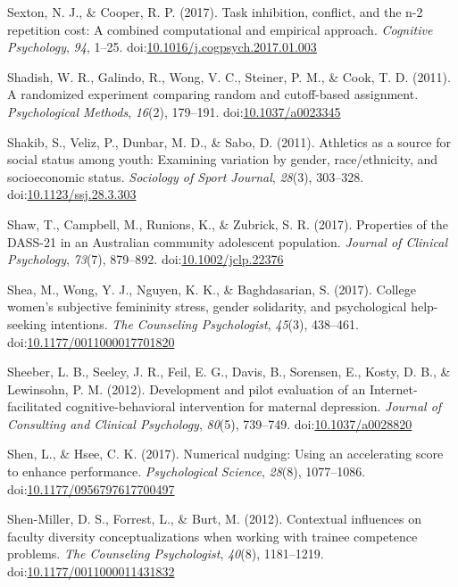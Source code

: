 \documentclass[english,man]{apa6}
\begin{document}
\hypertarget{ref-Sexton2017}{}
Sexton, N. J., \& Cooper, R. P. (2017). Task inhibition, conflict, and
the n-2 repetition cost: A combined computational and empirical
approach. \emph{Cognitive Psychology}, \emph{94}, 1--25.
doi:\href{https://doi.org/10.1016/j.cogpsych.2017.01.003}{10.1016/j.cogpsych.2017.01.003}

\hypertarget{ref-Shadish2011}{}
Shadish, W. R., Galindo, R., Wong, V. C., Steiner, P. M., \& Cook, T. D.
(2011). A randomized experiment comparing random and cutoff-based
assignment. \emph{Psychological Methods}, \emph{16}(2), 179--191.
doi:\href{https://doi.org/10.1037/a0023345}{10.1037/a0023345}

\hypertarget{ref-Shakib2011}{}
Shakib, S., Veliz, P., Dunbar, M. D., \& Sabo, D. (2011). Athletics as a
source for social status among youth: Examining variation by gender,
race/ethnicity, and socioeconomic status. \emph{Sociology of Sport
Journal}, \emph{28}(3), 303--328.
doi:\href{https://doi.org/10.1123/ssj.28.3.303}{10.1123/ssj.28.3.303}

\hypertarget{ref-Shaw2017}{}
Shaw, T., Campbell, M., Runions, K., \& Zubrick, S. R. (2017).
Properties of the DASS-21 in an Australian community adolescent
population. \emph{Journal of Clinical Psychology}, \emph{73}(7),
879--892.
doi:\href{https://doi.org/10.1002/jclp.22376}{10.1002/jclp.22376}

\hypertarget{ref-Shea2017}{}
Shea, M., Wong, Y. J., Nguyen, K. K., \& Baghdasarian, S. (2017).
College women's subjective femininity stress, gender solidarity, and
psychological help-seeking intentions. \emph{The Counseling
Psychologist}, \emph{45}(3), 438--461.
doi:\href{https://doi.org/10.1177/0011000017701820}{10.1177/0011000017701820}

\hypertarget{ref-Sheeber2012}{}
Sheeber, L. B., Seeley, J. R., Feil, E. G., Davis, B., Sorensen, E.,
Kosty, D. B., \& Lewinsohn, P. M. (2012). Development and pilot
evaluation of an Internet-facilitated cognitive-behavioral intervention
for maternal depression. \emph{Journal of Consulting and Clinical
Psychology}, \emph{80}(5), 739--749.
doi:\href{https://doi.org/10.1037/a0028820}{10.1037/a0028820}

\hypertarget{ref-Shen2017}{}
Shen, L., \& Hsee, C. K. (2017). Numerical nudging: Using an
accelerating score to enhance performance. \emph{Psychological Science},
\emph{28}(8), 1077--1086.
doi:\href{https://doi.org/10.1177/0956797617700497}{10.1177/0956797617700497}

\hypertarget{ref-Shen-Miller2012}{}
Shen-Miller, D. S., Forrest, L., \& Burt, M. (2012). Contextual
influences on faculty diversity conceptualizations when working with
trainee competence problems. \emph{The Counseling Psychologist},
\emph{40}(8), 1181--1219.
doi:\href{https://doi.org/10.1177/0011000011431832}{10.1177/0011000011431832}
\end{document}
